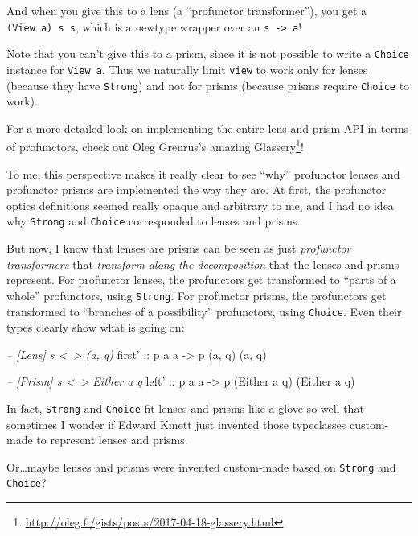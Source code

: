 \documentclass[]{article}
\newenvironment{Shaded}{}{}
\newcommand{\CommentTok}[1]{\textcolor[rgb]{0.38,0.63,0.69}{\textit{#1}}}
\newcommand{\DataTypeTok}[1]{\textcolor[rgb]{0.56,0.13,0.00}{#1}}
\newcommand{\NormalTok}[1]{#1}
\newcommand{\OtherTok}[1]{\textcolor[rgb]{0.00,0.44,0.13}{#1}}
\renewcommand{\href}[2]{#2\footnote{\url{#1}}}
\begin{document}
And when you give this to a lens (a ``profunctor transformer''), you get a
\texttt{(View\ a)\ s\ s}, which is a newtype wrapper over an
\texttt{s\ -\textgreater{}\ a}!

Note that you can't give this to a prism, since it is not possible to write a
\texttt{Choice} instance for \texttt{View\ a}. Thus we naturally limit
\texttt{view} to work only for lenses (because they have \texttt{Strong}) and
not for prisms (because prisms require \texttt{Choice} to work).

For a more detailed look on implementing the entire lens and prism API in terms
of profunctors, check out Oleg Grenrus's amazing
\href{http://oleg.fi/gists/posts/2017-04-18-glassery.html}{Glassery}!

To me, this perspective makes it really clear to see ``why'' profunctor lenses
and profunctor prisms are implemented the way they are. At first, the profunctor
optics definitions seemed really opaque and arbitrary to me, and I had no idea
why \texttt{Strong} and \texttt{Choice} corresponded to lenses and prisms.

But now, I know that lenses are prisms can be seen as just \emph{profunctor
transformers} that \emph{transform along the decomposition} that the lenses and
prisms represent. For profunctor lenses, the profunctors get transformed to
``parts of a whole'' profunctors, using \texttt{Strong}. For profunctor prisms,
the profunctors get transformed to ``branches of a possibility'' profunctors,
using \texttt{Choice}. Even their types clearly show what is going on:

\begin{Shaded}
\begin{Highlighting}[]
\CommentTok{-- [Lens]  s <~> (a, q)}
\OtherTok{first' ::}\NormalTok{ p a a }\OtherTok{->}\NormalTok{ p (a, q) (a, q)}

\CommentTok{-- [Prism] s <~> Either a q}
\OtherTok{left'  ::}\NormalTok{ p a a }\OtherTok{->}\NormalTok{ p (}\DataTypeTok{Either}\NormalTok{ a q) (}\DataTypeTok{Either}\NormalTok{ a q)}
\end{Highlighting}
\end{Shaded}

In fact, \texttt{Strong} and \texttt{Choice} fit lenses and prisms like a glove
so well that sometimes I wonder if Edward Kmett just invented those typeclasses
custom-made to represent lenses and prisms.

Or\ldots{}maybe lenses and prisms were invented custom-made based on
\texttt{Strong} and \texttt{Choice}?
\end{document}

